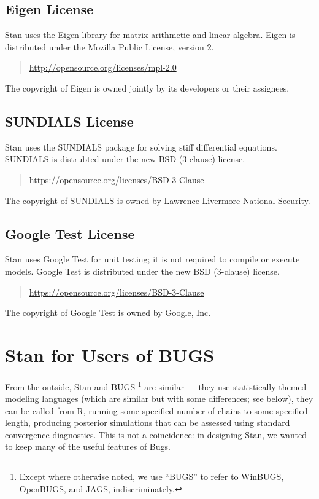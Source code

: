 \section{Eigen License} 

Stan uses the Eigen library for matrix arithmetic and linear algebra.
Eigen is distributed under the Mozilla Public License, version 2.
%
\begin{quote}
\url{http://opensource.org/licenses/mpl-2.0}
\end{quote}
%
The copyright of Eigen is owned jointly by its developers or their
assignees. 

\section{SUNDIALS License}

Stan uses the SUNDIALS package for solving stiff differential
equations.  SUNDIALS is distrubted under the new BSD (3-clause) license.
%
\begin{quote}
\url{https://opensource.org/licenses/BSD-3-Clause}
\end{quote}
%
The copyright of SUNDIALS is owned by Lawrence Livermore National
Security.

\section{Google Test License}

Stan uses Google Test for unit testing; it is not required to compile
or execute models.  Google Test is distributed under the new BSD (3-clause)
license.
%
\begin{quote}
\url{https://opensource.org/licenses/BSD-3-Clause}
\end{quote}
%
The copyright of Google Test is owned by Google, Inc.


\chapter{Stan for Users of BUGS}\label{stan-for-bugs.appendix}

From the outside, Stan and BUGS%
%
\footnote{Except where otherwise noted, we use ``BUGS'' to refer to
  WinBUGS, OpenBUGS, and JAGS, indiscriminately.}
%
are similar --- they use statistically-themed modeling languages
(which are similar but with some differences; see below), they can be
called from R, running some specified number of chains to some
specified length, producing posterior simulations that can be assessed
using standard convergence diagnostics.  This is not a coincidence:
in designing Stan, we wanted to keep many of the useful features of
Bugs.

